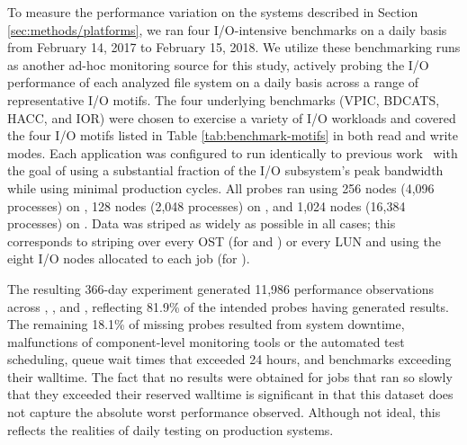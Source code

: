 To measure the performance variation on the systems described in Section \ref{sec:methods/platforms}, we ran four I/O-intensive benchmarks on a daily basis from February 14, 2017 to February 15, 2018.
We utilize these benchmarking runs as another ad-hoc monitoring source for this study, actively probing the I/O performance of each analyzed file system on a daily basis across a range of representative I/O motifs.
The four underlying benchmarks (VPIC, BDCATS, HACC, and IOR) were chosen to exercise a variety of I/O workloads and covered the four I/O motifs listed in Table \ref{tab:benchmark-motifs} in both read and write modes.
Each application was configured to run identically to previous work~\cite{Lockwood2017} with the goal of using a substantial fraction of the I/O subsystem's peak bandwidth while using minimal production cycles.
All probes ran using 256 nodes (4,096 processes) on \cori, 128 nodes (2,048 processes) on \edison, and 1,024 nodes (16,384 processes) on \mira.
Data was striped as widely as possible in all cases; this corresponds to striping over every OST (for \cori and \edison) or every LUN and using the eight I/O nodes allocated to each job (for \mira).

The resulting 366-day experiment generated 11,986 performance observations across \mira, \cori, and \edison, reflecting 81.9\% of the intended probes having generated results.
The remaining 18.1\% of missing probes resulted from system downtime, malfunctions of component-level monitoring tools or the automated test scheduling, queue wait times that exceeded 24 hours, and benchmarks exceeding their walltime.
The fact that no results were obtained for jobs that ran so slowly that they exceeded their reserved walltime is significant in that this dataset does not capture the absolute worst performance observed.
Although not ideal, this reflects the realities of daily testing on production systems.


